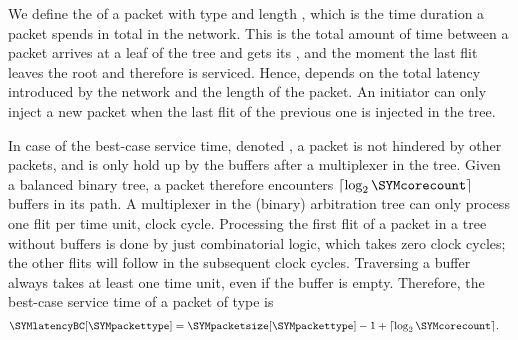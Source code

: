 We define the \emph{} \SYMlatency[\SYMpackettype] of a packet with type \SYMpackettype and length \SYMpacketsize*[\SYMpackettype], which is the time duration a packet spends in total in the network.
This is the total amount of time between a packet arrives at a leaf of the tree and gets its , and the moment the last \ac{flit} leaves the root and therefore is serviced.
Hence, \SYMlatency depends on the total latency introduced by the network and the length of the packet.
An initiator can only inject a new packet when the last \ac{flit} of the previous one is injected in the tree. %

In case of the best-case service time, denoted \SYMlatencyBC*, a packet is not hindered by other packets, and is only hold up by the buffers after a multiplexer in the tree.
Given a balanced binary tree, a packet therefore encounters $\lceil\log_2\SYMcorecount\rceil$ buffers in its path.
A multiplexer in the (binary) arbitration tree can only process one \ac{flit} per time unit, \ie clock cycle.
Processing the first \ac{flit} of a packet in a tree without buffers is done by just combinatorial logic, which takes zero clock cycles; the other \acp{flit} will follow in the subsequent clock cycles.
Traversing a buffer always takes at least one time unit, even if the buffer is empty.
Therefore, the best-case service time of a packet of type \SYMpackettype is
\begin{align}
\SYMlatencyBC[\SYMpackettype] &= \SYMpacketsize[\SYMpackettype]-1+\lceil\log_2\SYMcorecount\rceil. \label{eq:hardware:latency_bc}
\end{align}

